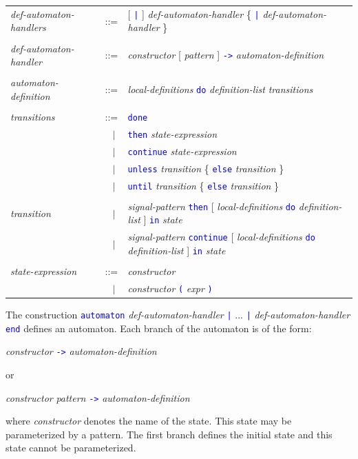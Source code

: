 \documentclass[11pt,titlepage,twoside]{report}
\newcommand{\alt}{\;|\;}
\newcommand{\Then}{\mbox{{\tt then}}}
\newcommand{\Continue}{\mbox{\tt continue}}
\newcommand{\Do}{\mbox{\tt do}}
\newcommand{\Done}{\mbox{\tt done}}
\newcommand{\term}[1]{\textcolor{Blue}{\tt #1}}
\newcommand{\nterm}[1]{\textcolor{BrickRed}{\it #1}}
\newcommand{\term}[1]{{\tt #1}}
\newcommand{\nterm}[1]{{\em #1}}
\begin{document}
\begin{center}
\begin{tabular}{lcl}
\nterm{def-automaton-handlers}
   & ::=        & [ \term{|} ] \nterm{def-automaton-handler}
                  \{ \term{|} \nterm{def-automaton-handler} \} 
\\ \\
\nterm{def-automaton-handler}
   & ::=        & \nterm{constructor} [ \nterm{pattern} ] \term{->}
                  \nterm{automaton-definition}
\\ \\
\nterm{automaton-definition}
   & ::=        & \nterm{local-definitions}
                  \term{\Do} \nterm{definition-list} \nterm{transitions}
\\ \\
\nterm{transitions}
   & ::=        & \term{\Done} \\
   & $\;\;\alt$ & \term{\Then} \nterm{state-expression} \\
   & $\;\;\alt$ & \term{\Continue} \nterm{state-expression} \\
   & $\;\;\alt$ & \term{unless} \nterm{transition}
                     \{ \term{else} \nterm{transition} \}
\\
   & $\;\;\alt$ & \term{until} \nterm{transition}
                     \{ \term{else} \nterm{transition} \}
\\ \\
\nterm{transition}
& $\;\;\alt$ & \nterm{signal-pattern} \term{\Then}
                  [ \nterm{local-definitions} \term{do} \nterm{definition-list} ]
                  \term{in} \nterm{state}
                  \\
& $\;\;\alt$ & \nterm{signal-pattern} \term{\Continue}
                  [ \nterm{local-definitions} \term{do} \nterm{definition-list} ]
                  \term{in} \nterm{state}
\\ \\
\nterm{state-expression}
   & ::=        & \nterm{constructor} \\
   & $\;\;\alt$ & \nterm{constructor} \term{(} \nterm{expr} \term{)}
\end{tabular}
\end{center}

The construction \term{automaton} \nterm{def-automaton-handler} \term{|}
... \term{|} \nterm{def-automaton-handler} \term{end} defines an
automaton. Each branch of the automaton is of the form:
\begin{center} 
  \nterm{constructor} \term{->} \nterm{automaton-definition}
\end{center}
or
\begin{center}
  \nterm{constructor} \nterm{pattern} \term{->} \nterm{automaton-definition}
\end{center}
where \nterm{constructor} denotes the name of the state. This state
may be parameterized by a pattern.  The first branch defines the
initial state and this state cannot be parameterized.
\end{document}
